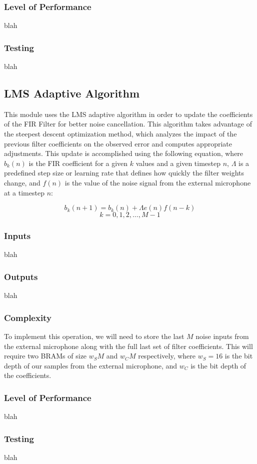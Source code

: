 \documentclass[12pt]{article}
\begin{document}
\begin{multicols}{2}
\subsubsection{Level of Performance}
blah
\subsubsection{Testing}
blah

\subsection{LMS Adaptive Algorithm}
This module uses the LMS adaptive algorithm in order to update the coefficients of the FIR Filter for better noise cancellation. This algorithm takes advantage of the steepest descent optimization method, which analyzes the impact of the previous filter coefficients on the observed error and computes appropriate adjustments. This update is accomplished using the following equation, where $b_k(n)$ is the FIR coefficient for a given $k$ values and a given timestep $n$, $\Lambda$ is a predefined step size or learning rate that defines how quickly the filter weights change, and $f(n)$ is the value of the noise signal from the external microphone at a timestep $n$:

\[ b_k(n + 1) = b_k(n) + \Lambda e(n)f(n-k) \]
\[ k = 0, 1, 2,\ldots,  M-1 \]

\subsubsection{Inputs}
blah
\subsubsection{Outputs}
blah
\subsubsection{Complexity}
To implement this operation, we will need to store the last $M$ noise inputs from the external microphone along with the full last set of filter coefficients. This will require two BRAMs of size $w_S M$ and $w_C M$ respectively, where $w_S = 16$ is the bit depth of our samples from the external microphone, and $w_C$ is the bit depth of the coefficients.
\subsubsection{Level of Performance}
blah
\subsubsection{Testing}
blah


\end{multicols}
\end{document}
